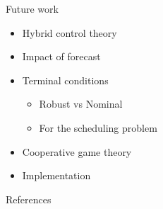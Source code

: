 \documentclass[table]{beamer}
\begin{document}
\begin{frame}{Future work}
\begin{itemize}

\item Hybrid control theory

\item Impact of forecast

\item Terminal conditions 
 \begin{itemize}
   \item Robust vs Nominal
   \item For the scheduling problem
\end{itemize}
\item Cooperative game theory
\item Implementation
\end{itemize}


\end{frame}


{\NoHeaderFooter
 \begin{frame}[allowframebreaks]{References}
  \addtocounter{framenumber}{-2}
  \scriptsize
  
 \end{frame} 
}
\end{document}
